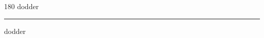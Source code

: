 
\begin{frame}
\begin{center}
\begin{turn}{180}
{\fontsize{2.5cm}{1em}\selectfont dodder}
\end{turn}
\vspace{1em}\par  
\hrule
\vspace{1em}\par  
{\fontsize{2.5cm}{1em}\selectfont dodder}
\end{center}
\end{frame}
